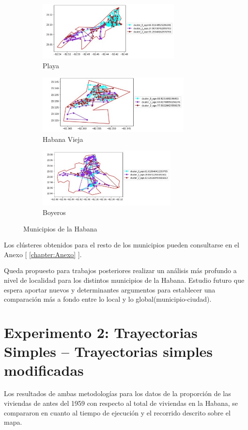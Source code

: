 \begin{figure}[h!]
	\centering
	\begin{subfigure}[b]{0.49\linewidth}
		\includegraphics[width=\linewidth, height=3cm]{Images/Playa.jpg}
		\caption{Playa}
	\end{subfigure}
	\begin{subfigure}[b]{0.49\linewidth}
		\includegraphics[width=\linewidth, height=3cm]{Images/HabV.jpg}
		\caption{Habana Vieja}
	\end{subfigure}
	\begin{subfigure}[b]{0.49\linewidth}
		\includegraphics[width=\linewidth, height=3cm]{Images/Boyeros.jpg}
		\caption{Boyeros}
	\end{subfigure}
	\caption{Municipios de la Habana}
	\label{fig:muns}
	
\end{figure}

Los clústeres obtenidos para el resto de los municipios pueden consultarse en el Anexo [ \ref{chapter:Anexo} ].

\newpage
Queda propuesto para trabajos posteriores realizar un análisis más profundo a nivel de localidad para los distintos municipios de la Habana. Estudio futuro que espera aportar nuevos y determinantes argumentos para establecer una comparación más a fondo entre lo local y lo global(municipio-ciudad).
\newpage
\section{Experimento 2: Trayectorias Simples – Trayectorias simples modificadas}
Los resultados de ambas metodologías para los datos de la proporción de las viviendas de antes del 1959 con respecto al total de viviendas en la Habana, se compararon en cuanto al tiempo de ejecución y el recorrido descrito sobre el mapa.

